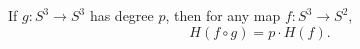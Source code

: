 If $g \colon S^{3} \to S^{3}$ has degree $p$, then for any map $f \colon S^{3} \to S^{2}$,
$$
H(f \circ g) = p \cdot H(f).
$$
